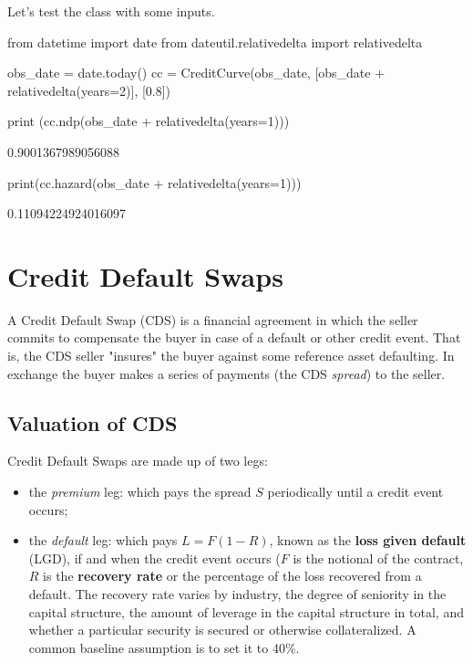 Let's test the class with some inputs.
\begin{ipython}
from datetime import date
from dateutil.relativedelta import relativedelta
	
obs_date = date.today()
cc = CreditCurve(obs_date, [obs_date + relativedelta(years=2)], [0.8])
	
print (cc.ndp(obs_date + relativedelta(years=1)))
\end{ipython}
\begin{ioutput}
0.9001367989056088
\end{ioutput}
\begin{ipython}
print(cc.hazard(obs_date + relativedelta(years=1)))
\end{ipython}
\begin{ioutput}
0.11094224924016097
\end{ioutput}

\section{Credit Default Swaps}
\label{sec:credit-default-swaps}


A Credit Default Swap (CDS) is a financial agreement in which the seller commits to compensate the buyer in case of a default or other credit event. That is, the CDS seller "insures" the buyer against some reference asset defaulting. In exchange the buyer makes a series of payments (the CDS \emph{spread}) to the seller.

\subsection{Valuation of CDS}
\label{sec:cds_valuation}

Credit Default Swaps are made up of two legs:

\begin{itemize}
\tightlist
\item the \emph{premium} leg: which pays the spread $S$ periodically until a credit event occurs;
\item the \emph{default} leg: which pays $L = F(1 - R)$, known as the \textbf{loss given default} (LGD), if and when the credit event occurs ($F$ is the notional of the contract, $R$ is the \textbf{recovery rate} or the percentage of the loss recovered from a default. The recovery rate varies by industry, the degree of seniority in the capital structure, the amount of leverage in the capital structure in total, and whether a particular security is secured or otherwise collateralized. A common baseline assumption is to set it to 40\%.
\end{itemize}

